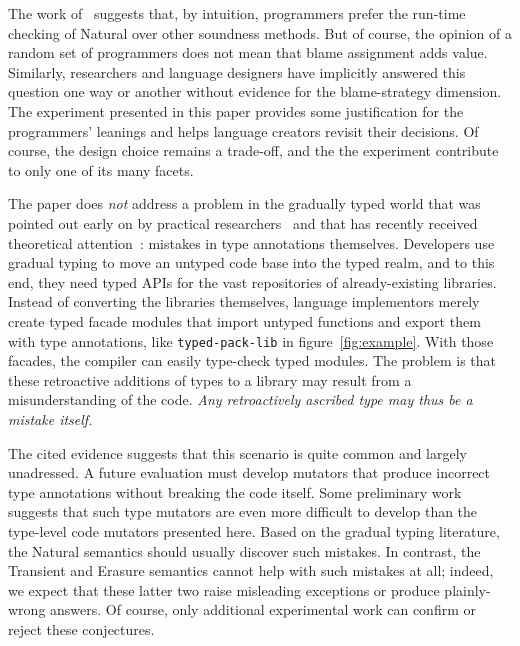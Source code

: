 
The work of~\citet{tgpk-dls-2018} suggests that, by intuition, programmers
prefer the run-time checking of Natural over other soundness methods. But of course,
the opinion of a random set of programmers does not mean that blame
assignment adds value. Similarly, researchers and language designers have
implicitly answered this question one way or another without evidence for the
blame-strategy dimension. The experiment presented in this paper provides some
justification for the programmers' leanings and helps language creators revisit
their decisions. Of course, the design choice remains a trade-off, and the
the experiment contribute to only one of its many facets. 

The paper does {\em not\/} address a problem in the gradually typed world that
was pointed out early on by practical researchers~\citep{incorrect-ts,
sta-nt-base-types, wmwz-ecoop-2017} and that has recently received theoretical
attention~\citep{gfd-oopsla-2019, cc-oopsla-20}: mistakes in type annotations
themselves.  Developers use gradual typing to move an untyped code base into the
typed realm, and to this end, they need typed APIs for the vast repositories of
already-existing libraries. Instead of converting the libraries themselves,
language implementors merely create typed facade modules that import untyped
functions and export them with type annotations, like {\tt typed-pack-lib} in
figure~\ref{fig:example}.  With those facades, the compiler can easily
type-check typed modules. The problem is that these retroactive additions of
types to a library may result from a misunderstanding of the code. \emph{Any
retroactively ascribed type may thus be a mistake itself.}

The cited evidence suggests that this scenario is quite common and largely
unadressed.  A future evaluation must develop mutators that produce incorrect
type annotations without breaking the code itself. Some preliminary work
suggests that such type mutators are even more difficult to develop than the
type-level code mutators presented here. Based on the gradual typing literature,
the Natural semantics should usually discover such mistakes. In contrast, the
Transient and Erasure semantics cannot help with such mistakes at all; indeed,
we expect that these latter two raise misleading exceptions or produce
plainly-wrong answers.  Of course, only additional experimental work can confirm
or reject these conjectures.



